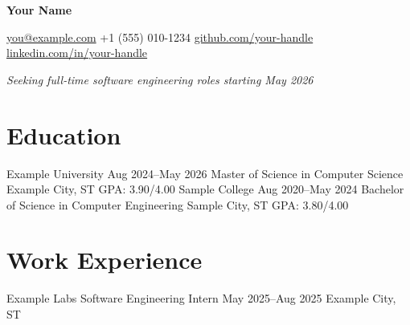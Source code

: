 \documentclass[letterpaper,10pt]{article}
\begin{document}
\begin{center}
{\fontsize{18}{21}\selectfont\bfseries Your Name\par}
\vspace{4pt}
\small
\href{mailto:you@example.com}{you@example.com}
\quad\textbar\quad +1 (555) 010-1234
\quad\textbar\quad \href{https://github.com/your-handle}{github.com/your-handle}
\quad\textbar\quad \href{https://www.linkedin.com/in/your-handle}{linkedin.com/in/your-handle}
\par\vspace{2pt}
\textit{Seeking full-time software engineering roles starting May 2026}
\end{center}

\section{Education}
\begin{resumeList}
\resumeEducation
  {Example University}
  {Aug 2024--May 2026}
  {Master of Science in Computer Science}
  {Example City, ST}
  {GPA: 3.90/4.00}
\resumeEducation
  {Sample College}
  {Aug 2020--May 2024}
  {Bachelor of Science in Computer Engineering}
  {Sample City, ST}
  {GPA: 3.80/4.00}
\end{resumeList}
\vspace{-8pt}

\section{Work Experience}
\begin{resumeList}
\resumeHeading
  {Example Labs}
  {Software Engineering Intern}
  {May 2025--Aug 2025}
  {Example City, ST}
\begin{resumeBullets}
\end{resumeBullets}
\end{resumeList}
\vspace{-2pt}
\end{document}
